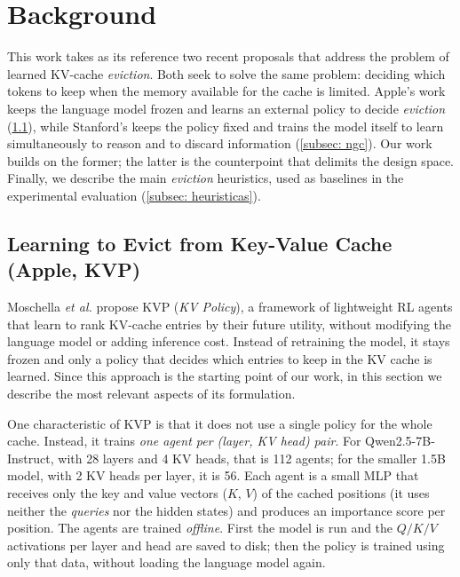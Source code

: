 \section{Background} \label{section: antecedentes}

This work takes as its reference two recent proposals that address the problem of learned KV-cache \textit{eviction}. Both seek to solve the same problem: deciding which tokens to keep when the memory available for the cache is limited. Apple's work keeps the language model frozen and learns an external policy to decide \textit{eviction} (\cref{subsec: kvp}), while Stanford's keeps the policy fixed and trains the model itself to learn simultaneously to reason and to discard information (\cref{subsec: ngc}). Our work builds on the former; the latter is the counterpoint that delimits the design space.
Finally, we describe the main \textit{eviction} heuristics, used as baselines in the experimental evaluation (\cref{subsec: heuristicas}).

\subsection{Learning to Evict from Key-Value Cache (Apple, KVP)} \label{subsec: kvp}

Moschella \textit{et al.} \cite{moschella2026kvp} propose KVP (\textit{KV Policy}), a framework of lightweight RL agents that learn to rank KV-cache entries by their future utility, without modifying the language model or adding inference cost. Instead of retraining the model, it stays frozen and only a policy that decides which entries to keep in the KV cache is learned. Since this approach is the starting point of our work, in this section we describe the most relevant aspects of its formulation.

One characteristic of KVP is that it does not use a single policy for the whole cache. Instead, it trains \emph{one agent per (layer, KV head) pair}. For Qwen2.5-7B-Instruct, with 28 layers and 4 KV heads, that is 112 agents; for the smaller 1.5B model, with 2 KV heads per layer, it is 56. Each agent is a small MLP that receives only the key and value vectors ($K$, $V$) of the cached positions (it uses neither the \textit{queries} nor the hidden states) and produces an importance score per position. The agents are trained \emph{offline}. First the model is run and the $Q/K/V$ activations per layer and head are saved to disk; then the policy is trained using only that data, without loading the language model again.

